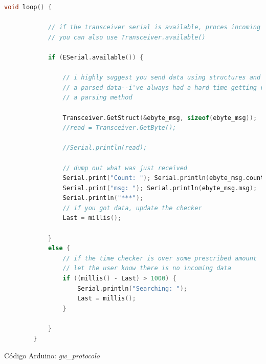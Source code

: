 \documentclass[12pt]{article}
\begin{document}
\begin{lstlisting}[language=C]
		void loop() {
			
			// if the transceiver serial is available, proces incoming data
			// you can also use Transceiver.available()
			
			if (ESerial.available()) {
				
				// i highly suggest you send data using structures and not
				// a parsed data--i've always had a hard time getting reliable data using
				// a parsing method
				
				Transceiver.GetStruct(&ebyte_msg, sizeof(ebyte_msg));
				//read = Transceiver.GetByte();
				
				//Serial.println(read);
				
				// dump out what was just received
				Serial.print("Count: "); Serial.println(ebyte_msg.count);
				Serial.print("msg: "); Serial.println(ebyte_msg.msg);
				Serial.println("***");
				// if you got data, update the checker
				Last = millis();
				
			}
			else {
				// if the time checker is over some prescribed amount
				// let the user know there is no incoming data
				if ((millis() - Last) > 1000) {
					Serial.println("Searching: ");
					Last = millis();
				}
				
			}
		}
	\end{lstlisting}
	
	\pagebreak
	
	\noindent Código Arduino: \textit{gw\_protocolo} \\
	
\end{document}
